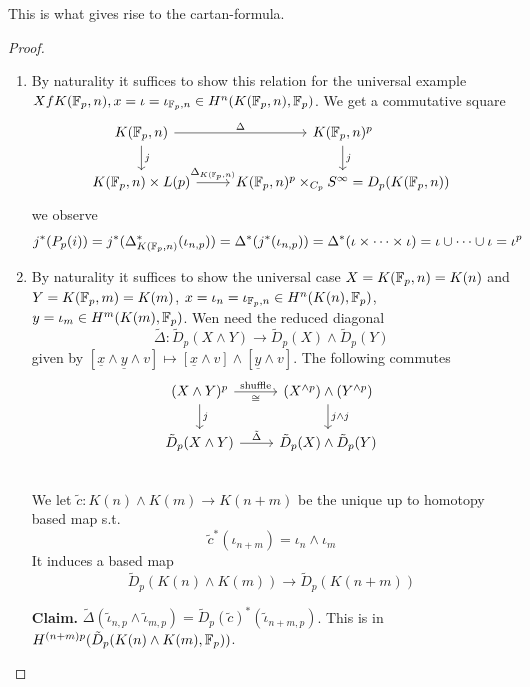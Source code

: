 \documentclass[language=english]{TemplateLecture}
\begin{document}
This is what gives rise to the cartan-formula.

\begin{proof}
    \begin{enumerate}
        \item By naturality it suffices to show this relation for the universal example \(X f K(\mathbb{F}_p, n), x = \iota = \iota_{\mathbb{F}_p, n} \in H^n(K(\mathbb{F}_p, n), \mathbb{F}_p)\). We get a commutative square
        \[\begin{tikzcd}
            K(\IF_p,n) \ar[d, "j"] \ar[r, "\Delta"] & K(\IF_p, n)^p \ar[d, "j"] \\
            K(\IF_p, n)\times L(p) \ar[r, "\Delta_{K(\IF_p,n)}"] & K(\IF_p,n)^p\times_{C_p}S^\infty = D_p(K(\IF_p, n))
        \end{tikzcd}\]
        we observe
        \[j^*(P_p(i)) = j^*(\Delta_{K(\mathbb{F}_p, n)}^*(\iota_{n,p})) = \Delta^*(j^*(\iota_{n,p})) = \Delta^*(\iota\times \dots \times \iota) = \iota\cup\dots \cup \iota = \iota^p\]
        \item By naturality it suffices to show  the universal case \(X = K(\mathbb{F}_p, n) = K(n)\) and \(Y = K(\mathbb{F}_p,m) = K(m)\), \(x = \iota_n = \iota_{\mathbb{F}_p, n} \in H^n(K(n), \mathbb{F}_p)\), \(y = \iota_m \in H^m(K(m), \mathbb{F}_p)\).
        Wen need the reduced diagonal
        \[\tilde \Delta\colon \tilde D_p(X\wedge Y) \to \tilde D_p(X)\wedge \tilde D_p(Y)\]
        given by \([\underline x \wedge \underline y\wedge v] \mapsto[\underline x\wedge v]\wedge [\underline y \wedge v] \). The following commutes
        \[\begin{tikzcd}
            (X\wedge Y)^p \ar[d, "j"] \ar[r, "\text{shuffle}", "\cong"'] & (X^{\wedge p})\wedge (Y^{\wedge p}) \ar[d, "j\wedge j"] \\
            \tilde D_p(X\wedge Y) \ar[r, "\tilde\Delta"] & \tilde D_p(X)\wedge \tilde D_p(Y) \\
        \end{tikzcd}\]
        We let \(\tilde c\colon K(n)\wedge K(m)\to K(n+m)\) be the unique up to homotopy based map s.t.
        \[\tilde c^*(\iota_{n+m}) = \iota_n\wedge \iota_m\]
        It induces a based map
        \[\tilde D_p(K(n)\wedge K(m))\to \tilde D_p(K(n+m))\]

        \textbf{Claim.} \(\tilde\Delta(\tilde \iota_{n,p}\wedge \tilde \iota_{m,p}) = \tilde D_p(\tilde c)^*(\tilde\iota_{n+m,p})\). This is in \(H^{(n+m)p}(\tilde D_p(K(n)\wedge K(m), \mathbb{F}_p))\).


\end{enumerate}
\end{proof}
\end{document}
